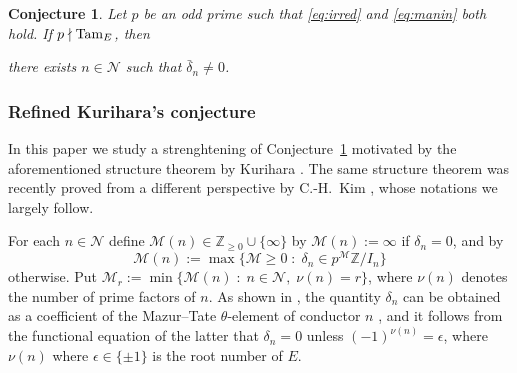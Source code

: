 \documentclass[10pt,reqno]{amsart}
\numberwithin{equation}{section}
\theoremstyle{plain}
\theoremstyle{definition}
\theoremstyle{definition}
\theoremstyle{plain}
\theoremstyle{plain}
\theoremstyle{plain}
\theoremstyle{plain}
\theoremstyle{plain}
\theoremstyle{plain}
\newtheorem{conjintro}{Conjecture}
\newcommand{\Z}{\mathbb{Z}}
\begin{document}
\begin{conjintro}
\label{conj:Kurihara}
Let $p$ be an odd prime such that \eqref{eq:irred} and \eqref{eq:manin} both hold. If $p\nmid{\rm Tam}_E$, then  
\begin{center}
there exists $n\in \mathcal{N}$ such that $\bar{\delta}_{n}\neq 0$.
\end{center}
\end{conjintro}

\subsubsection{Refined Kurihara's conjecture}

In this paper we study a strenghtening of Conjecture~\ref{conj:Kurihara} motivated by the aforementioned structure theorem by Kurihara \cite{kurihara-munster}. The same structure theorem was recently proved from a different perspective by C.-H.~Kim \cite{kim}, whose notations we largely follow. 

For each $n\in\mathcal{N}$ define $\mathscr{M}(n)\in\Z_{\geq 0}\cup\{\infty\}$ by $\mathscr{M}(n):=\infty$ if $\delta_n=0$, and by
\[
\mathscr{M}(n):=\max\{\mathscr{M}\geq 0\;\colon\;\delta_n\in p^{\mathscr{M}}\Z/I_n\}
\]
otherwise. Put $\mathscr{M}_{r}:=\min\{\mathscr{M}(n)\;\colon\;n\in\mathcal{N},\;\nu(n)=r\}$, where $\nu(n)$ denotes the number of prime factors of $n$. As shown in \cite[\S{10.5}]{kurihara-munster}, the quantity $\delta_n$ can be obtained as a coefficient of the Mazur--Tate $\theta$-element of conductor $n$ \cite{mazur-tate}, and it follows from the functional equation of the latter that $\delta_n=0$ unless $(-1)^{\nu(n)}=\epsilon$, where $\nu(n)$ where $\epsilon\in\{\pm{1}\}$ is the root number of $E$.
\end{document}
